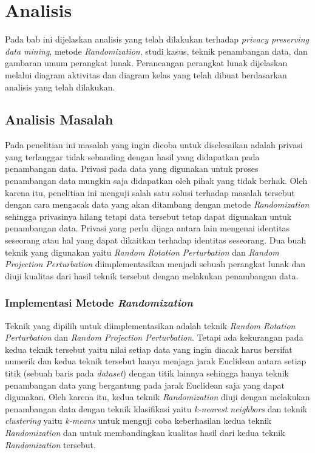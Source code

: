 \chapter{Analisis}
\label{chap:analisis}

Pada bab ini dijelaskan analisis yang telah dilakukan terhadap \textit{privacy preserving data mining}, metode \textit{Randomization}, studi kasus, teknik penambangan data, dan gambaran umum perangkat lunak. Perancangan perangkat lunak dijelaskan melalui diagram aktivitas dan diagram kelas yang telah dibuat berdasarkan analisis yang telah dilakukan.

\section{Analisis Masalah}
\label{sec:analisis-masalah}

Pada penelitian ini masalah yang ingin dicoba untuk diselesaikan adalah privasi yang terlanggar tidak sebanding dengan hasil yang didapatkan pada penambangan data. Privasi pada data yang digunakan untuk proses penambangan data mungkin saja didapatkan oleh pihak yang tidak berhak. Oleh karena itu, penelitian ini menguji salah satu solusi terhadap masalah tersebut dengan cara mengacak data yang akan ditambang dengan metode \textit{Randomization} sehingga privasinya hilang tetapi data tersebut tetap dapat digunakan untuk penambangan data. Privasi yang perlu dijaga antara lain mengenai identitas seseorang atau hal yang dapat dikaitkan terhadap identitas seseorang. Dua buah teknik yang digunakan yaitu \textit{Random Rotation Perturbation} dan \textit{Random Projection Perturbation} diimplementasikan menjadi sebuah perangkat lunak dan diuji kualitas dari hasil teknik tersebut dengan melakukan penambangan data.

\subsection{Implementasi Metode \textit{Randomization}}
\label{subsec:analisis-ppdm}

Teknik yang dipilih untuk diimplementasikan adalah teknik \textit{Random Rotation Perturbation} dan \textit{Random Projection Perturbation}. Tetapi ada kekurangan pada kedua teknik tersebut yaitu nilai setiap data yang ingin diacak harus bersifat numerik dan kedua teknik tersebut hanya menjaga jarak Euclidean antara setiap titik (sebuah baris pada \textit{dataset}) dengan titik lainnya sehingga hanya teknik penambangan data yang bergantung pada jarak Euclidean saja yang dapat digunakan. Oleh karena itu, kedua teknik \textit{Randomization} diuji dengan melakukan penambangan data dengan teknik klasifikasi yaitu \textit{k-nearest neighbors} dan teknik \textit{clustering} yaitu \textit{k-means} untuk menguji coba keberhasilan kedua teknik \textit{Randomization} dan untuk membandingkan kualitas hasil dari kedua teknik \textit{Randomization} tersebut.


